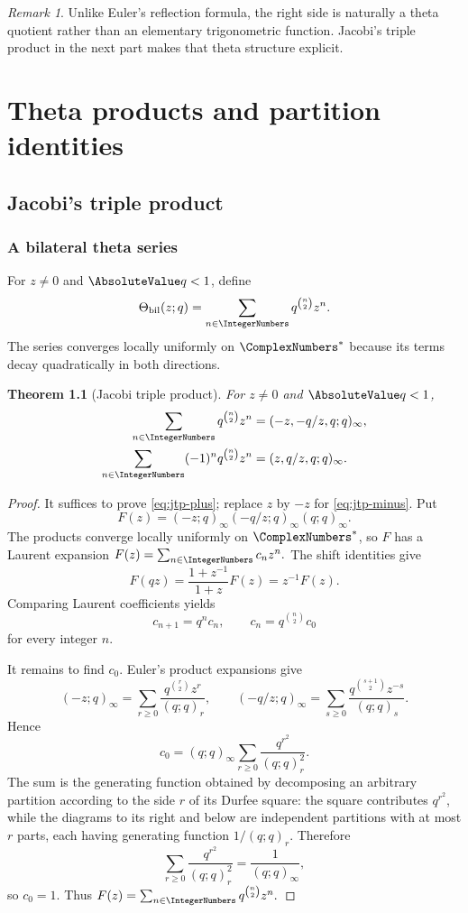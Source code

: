 \documentclass[11pt,a4paper,oneside,openany]{book}
\newtheorem{theorem}{Theorem}[chapter]
\theoremstyle{definition}
\theoremstyle{remark}
\newtheorem{remark}[remark]{Remark}
\newcommand{\BilateralTheta}[2]{\Theta_{\mathrm{bil}}\!\left(#1;#2\right)}
\begin{document}
\begin{remark}
Unlike Euler's reflection formula, the right side is naturally a theta quotient rather than an elementary trigonometric function.  Jacobi's triple product in the next part makes that theta structure explicit.
\end{remark}


\part{Theta products and partition identities}

\chapter{Jacobi's triple product}\label{chap:jtp}

\section{A bilateral theta series}

For $z\ne0$ and $\AbsoluteValue q<1$, define
\[
 \BilateralTheta{z}{q}=\sum_{n\in\IntegerNumbers}q^{\binom n2}z^n.
\]
The series converges locally uniformly on $\ComplexNumbers^*$ because its terms decay quadratically in both directions.

\begin{theorem}[Jacobi triple product]\label{thm:jtp}
For $z\ne0$ and $\AbsoluteValue q<1$,
\begin{align}
 \sum_{n\in\IntegerNumbers}q^{\binom n2}z^n
 &=(-z,-q/z,q;q)_\infty,\label{eq:jtp-plus}\\
 \sum_{n\in\IntegerNumbers}(-1)^nq^{\binom n2}z^n
 &=(z,q/z,q;q)_\infty.\label{eq:jtp-minus}
\end{align}
\end{theorem}

\begin{proof}
It suffices to prove \eqref{eq:jtp-plus}; replace $z$ by $-z$ for \eqref{eq:jtp-minus}.  Put
\[
 F(z)=(-z;q)_\infty(-q/z;q)_\infty(q;q)_\infty.
\]
The products converge locally uniformly on $\ComplexNumbers^*$, so $F$ has a Laurent expansion
\(
 F(z)=\sum_{n\in\IntegerNumbers}c_nz^n.
\)
The shift identities give
\[
 F(qz)=\frac{1+z^{-1}}{1+z}F(z)=z^{-1}F(z).
\]
Comparing Laurent coefficients yields
\[
 c_{n+1}=q^nc_n,
 \qquad
 c_n=q^{\binom n2}c_0
\]
for every integer $n$.

It remains to find $c_0$.  Euler's product expansions give
\[
 (-z;q)_\infty=\sum_{r\ge0}\frac{q^{\binom r2}z^r}{(q;q)_r},
 \qquad
 (-q/z;q)_\infty=\sum_{s\ge0}\frac{q^{\binom{s+1}{2}}z^{-s}}{(q;q)_s}.
\]
Hence
\[
 c_0=(q;q)_\infty\sum_{r\ge0}\frac{q^{r^2}}{(q;q)_r^2}.
\]
The sum is the generating function obtained by decomposing an arbitrary partition according to the side $r$ of its Durfee square: the square contributes $q^{r^2}$, while the diagrams to its right and below are independent partitions with at most $r$ parts, each having generating function $1/(q;q)_r$.  Therefore
\[
 \sum_{r\ge0}\frac{q^{r^2}}{(q;q)_r^2}
 =\frac1{(q;q)_\infty},
\]
so $c_0=1$.  Thus
\(
 F(z)=\sum_{n\in\IntegerNumbers}q^{\binom n2}z^n.
\)
\end{proof}
\end{document}
